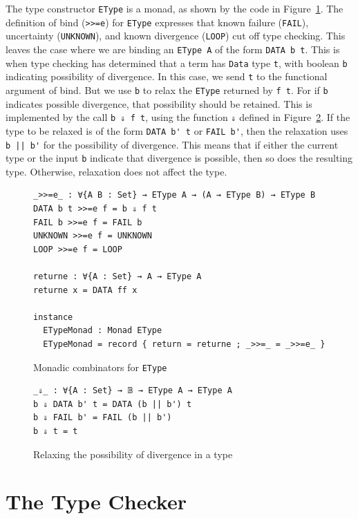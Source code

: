 \documentclass[acmsmall,screen,review]{acmart}
\begin{document}
The type constructor \verb|EType| is a monad, as shown by the code in
Figure~\ref{fig:etypemon}.  The definition of bind (\verb|>>=e|) for
\verb|EType| expresses that known failure (\verb|FAIL|), uncertainty
(\verb|UNKNOWN|), and known divergence (\verb|LOOP|) cut off type
checking.  This leaves the case where we are binding an \verb|EType A|
of the form \verb|DATA b t|.  This is when type checking has
determined that a term has \verb|Data| type \verb|t|, with boolean
\verb|b| indicating possibility of divergence.  In this case, we send
\verb|t| to the functional argument of bind.  But we use \verb|b|
to relax the \verb|EType| returned by \verb|f t|.  For if \verb|b| indicates
possible divergence, that possibility should be retained.  This is
implemented by the call \verb|b ⇓ f t|, using the function \verb|⇓| defined
in Figure~\ref{fig:down}.  If the type to be relaxed is of the form
\verb|DATA b' t| or \verb|FAIL b'|, then the relaxation uses \verb;b || b'; for the
possibility of divergence.  This means that if either the current type
or the input \verb|b| indicate that divergence is possible, then
so does the resulting type.  Otherwise, relaxation does not affect
the type.

\begin{figure}
\begin{verbatim}  
_>>=e_ : ∀{A B : Set} → EType A → (A → EType B) → EType B
DATA b t >>=e f = b ⇓ f t
FAIL b >>=e f = FAIL b
UNKNOWN >>=e f = UNKNOWN
LOOP >>=e f = LOOP

returne : ∀{A : Set} → A → EType A
returne x = DATA ff x

instance
  ETypeMonad : Monad EType
  ETypeMonad = record { return = returne ; _>>=_ = _>>=e_ }
\end{verbatim}  
\caption{Monadic combinators for \texttt{EType}}
\label{fig:etypemon}
\end{figure}

\begin{figure}
\begin{verbatim}  
_⇓_ : ∀{A : Set} → 𝔹 → EType A → EType A
b ⇓ DATA b' t = DATA (b || b') t
b ⇓ FAIL b' = FAIL (b || b')
b ⇓ t = t
\end{verbatim}  
\caption{Relaxing the possibility of divergence in a type}
\label{fig:down}
\end{figure}

\section{The Type Checker}
\end{document}
